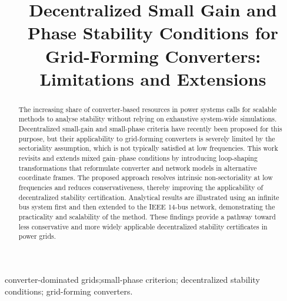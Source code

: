 \documentclass[conference]{IEEEtran}
\begin{document}
\title{Decentralized Small Gain and Phase Stability Conditions for Grid-Forming Converters: Limitations and Extensions}

\author{
\IEEEauthorblockA{AIT Austrian Institute of Technology,
Vienna, Austria
}}

\maketitle

\begin{abstract}
The increasing share of converter-based resources in power systems calls for scalable methods to analyse stability without relying on exhaustive system-wide simulations. Decentralized small-gain and small-phase criteria have recently been proposed for this purpose, but their applicability to grid-forming converters is severely limited by the sectoriality assumption, which is not typically satisfied at low frequencies. This work revisits and extends mixed gain–phase conditions by introducing loop-shaping transformations that reformulate converter and network models in alternative coordinate frames. The proposed approach resolves intrinsic non-sectoriality at low frequencies and reduces conservativeness, thereby improving the applicability of decentralized stability certification. Analytical results are illustrated using an infinite bus system first and then extended to the IEEE 14-bus network, demonstrating the practicality and scalability of the method. These findings provide a pathway toward less conservative and more widely applicable decentralized stability certificates in power grids.
\end{abstract}

\begin{IEEEkeywords}
converter-dominated grids;small-phase criterion; decentralized stability conditions; grid-forming converters.
\end{IEEEkeywords}










\end{document}
